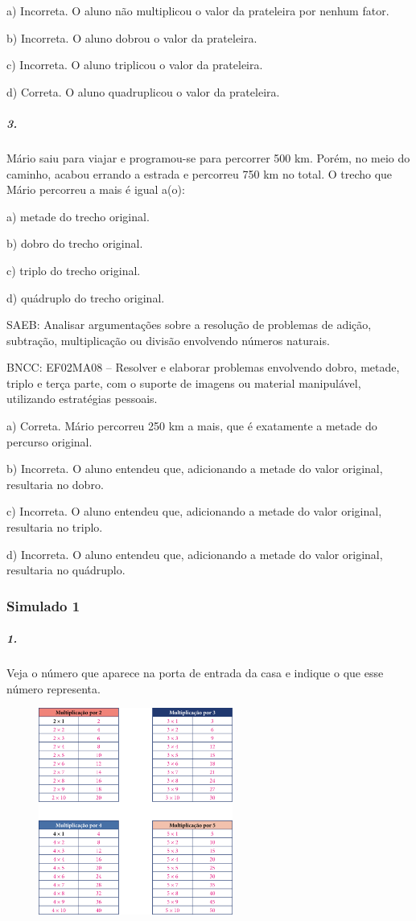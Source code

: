 a) Incorreta. O aluno não multiplicou o valor da prateleira por nenhum fator.

b) Incorreta. O aluno dobrou o valor da prateleira.

c) Incorreta. O aluno triplicou o valor da prateleira.

d) Correta. O aluno quadruplicou o valor da prateleira.

\subparagraph{3.}\label{section-99}

Mário saiu para viajar e programou-se para percorrer 500 km. Porém, no
meio do caminho, acabou errando a estrada e percorreu 750 km no total. O
trecho que Mário percorreu a mais é igual a(o):

a) metade do trecho original.

b) dobro do trecho original.

c) triplo do trecho original.

d) quádruplo do trecho original.

SAEB: Analisar argumentações sobre a resolução de problemas de adição,
subtração, multiplicação ou divisão envolvendo números naturais.

BNCC: EF02MA08 -- Resolver e elaborar problemas envolvendo dobro, metade,
triplo e terça parte, com o suporte de imagens ou material manipulável, utilizando estratégias
pessoais.

a) Correta. Mário percorreu 250 km a mais, que é exatamente a metade do
percurso original.

b) Incorreta. O aluno entendeu que, adicionando a metade do valor original,
resultaria no dobro.

c) Incorreta. O aluno entendeu que, adicionando a metade do valor original, resultaria no triplo.

d) Incorreta. O aluno entendeu que, adicionando a metade do valor original, resultaria no quádruplo.

\subsubsection{Simulado 1}\label{simulado-1}

\subparagraph{1. }\label{section-100}

Veja o número que aparece na porta de entrada da casa e indique o que
esse número representa.

\includegraphics[width=3.34635in,height=2.67708in]{media/image105.png}

